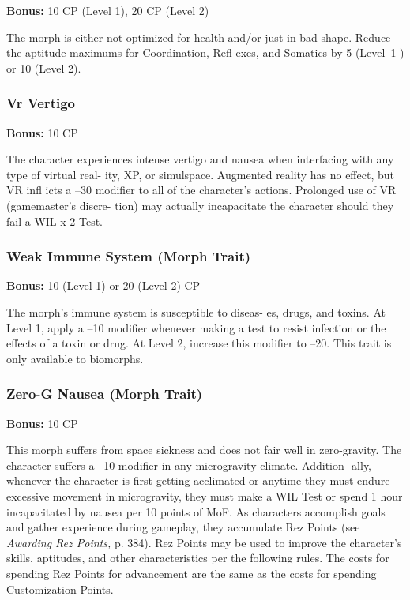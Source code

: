 \textbf{Bonus:} 10 CP (Level 1), 20 CP (Level 2)

The morph is either not optimized for health and/or 
just in bad shape. Reduce the aptitude maximums for 
Coordination, Refl exes, and Somatics by 5 (Level 1 ) 
or 10 (Level 2).

\subsubsection{Vr Vertigo}

\textbf{Bonus:} 10 CP

The character experiences intense vertigo and 
nausea when interfacing with any type of virtual real-
ity, XP, or simulspace. Augmented reality has no effect, 
but VR infl icts a –30 modifier to all of the character's 
actions. Prolonged use of VR (gamemaster's discre-
tion) may actually incapacitate the character should 
they fail a WIL x 2 Test.

\subsubsection{Weak Immune System (Morph Trait)}

\textbf{Bonus:} 10 (Level 1) or 20 (Level 2) CP

The morph's immune system is susceptible to diseas-
es, drugs, and toxins. At Level 1, apply a –10 modifier 
whenever making a test to resist infection or the effects 
of a toxin or drug. At Level 2, increase this modifier to 
–20. This trait is only available to biomorphs.

\subsubsection{Zero-G Nausea (Morph Trait)}

\textbf{Bonus:} 10 CP

This morph suffers from space sickness and does 
not fair well in zero-gravity. The character suffers a 
–10 modifier in any microgravity climate. Addition-
ally, whenever the character is first getting acclimated 
or anytime they must endure excessive movement in 
microgravity, they must make a WIL Test or spend 1 
hour incapacitated by nausea per 10 points of MoF.
As characters accomplish goals and gather experience 
during gameplay, they accumulate Rez Points (see 
\textit{Awarding Rez Points,} p. 384). Rez Points may be used 
to improve the character's skills, aptitudes, and other 
characteristics per the following rules. The costs for 
spending Rez Points for advancement are the same as 
the costs for spending Customization Points.

